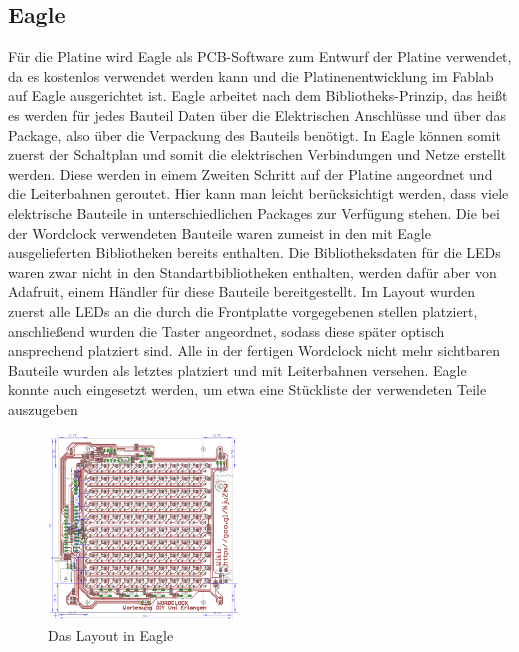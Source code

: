 \documentclass[12pt,journal,compsoc]{IEEEtran}
\begin{document}
\subsection{Eagle}
Für die Platine wird Eagle als PCB-Software zum Entwurf der Platine verwendet, da es kostenlos verwendet werden kann und die Platinenentwicklung im Fablab auf Eagle ausgerichtet ist. Eagle arbeitet nach dem Bibliotheks-Prinzip, das heißt es werden für jedes  Bauteil Daten über die Elektrischen Anschlüsse und über das Package, also über die Verpackung des Bauteils benötigt. In Eagle können somit  zuerst der Schaltplan und somit die elektrischen Verbindungen und Netze erstellt werden. Diese werden in einem Zweiten Schritt auf der Platine angeordnet und die Leiterbahnen geroutet. Hier kann man leicht berücksichtigt werden, dass viele elektrische Bauteile in unterschiedlichen Packages zur Verfügung stehen. Die bei der Wordclock verwendeten Bauteile waren zumeist in den mit Eagle ausgelieferten Bibliotheken bereits enthalten. Die Bibliotheksdaten für die LEDs waren zwar nicht in den Standartbibliotheken enthalten,  werden dafür aber von Adafruit, einem Händler für diese Bauteile bereitgestellt. Im Layout wurden zuerst alle LEDs an die durch die Frontplatte vorgegebenen stellen platziert, anschließend wurden die Taster angeordnet, sodass diese später optisch ansprechend platziert sind. Alle in der fertigen Wordclock nicht mehr sichtbaren Bauteile wurden als letztes platziert und mit Leiterbahnen versehen. Eagle konnte auch eingesetzt werden, um etwa eine Stückliste der verwendeten Teile auszugeben
\begin{figure}
	\centering
	\includegraphics[width=0.45\textwidth]{Bilder/Eagle.png}
	\caption{Das Layout in Eagle} 
	\label{fig:EagleL}
\end{figure}
\end{document}
